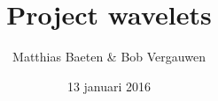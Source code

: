 

\title{Project wavelets}
\author{Matthias Baeten \& Bob Vergauwen}
\date{ 13 januari 2016}


	\maketitle
	
	
	\FloatBarrier
	
	

